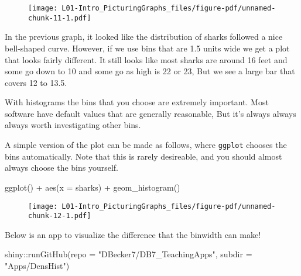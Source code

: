 \documentclass[
  letterpaper,
  DIV=11,
  numbers=noendperiod]{scrreprt}
\newenvironment{Shaded}{\begin{snugshade}}{\end{snugshade}}
\newcommand{\AttributeTok}[1]{\textcolor[rgb]{0.40,0.45,0.13}{#1}}
\newcommand{\FunctionTok}[1]{\textcolor[rgb]{0.28,0.35,0.67}{#1}}
\newcommand{\NormalTok}[1]{\textcolor[rgb]{0.00,0.23,0.31}{#1}}
\newcommand{\SpecialCharTok}[1]{\textcolor[rgb]{0.37,0.37,0.37}{#1}}
\newcommand{\StringTok}[1]{\textcolor[rgb]{0.13,0.47,0.30}{#1}}
\begin{document}
\begin{figure}[H]

{\centering \texttt{[image: L01-Intro\_PicturingGraphs\_files/figure-pdf/unnamed-chunk-11-1.pdf]}

}

\end{figure}

In the previous graph, it looked like the distribution of sharks
followed a nice bell-shaped curve. However, if we use bins that are 1.5
units wide we get a plot that looks fairly different. It still looks
like most sharks are around 16 feet and some go down to 10 and some go
as high is 22 or 23, But we see a large bar that covers 12 to 13.5.

With histograms the bins that you choose are extremely important. Most
software have default values that are generally reasonable, But it's
always always always worth investigating other bins.

A simple version of the plot can be made as follows, where
\texttt{ggplot} chooses the bins automatically. Note that this is rarely
desireable, and you should almost always choose the bins yourself.

\begin{Shaded}
\begin{Highlighting}[]
\FunctionTok{ggplot}\NormalTok{() }\SpecialCharTok{+} 
    \FunctionTok{aes}\NormalTok{(}\AttributeTok{x =}\NormalTok{ sharks) }\SpecialCharTok{+}
    \FunctionTok{geom\_histogram}\NormalTok{()}
\end{Highlighting}
\end{Shaded}

\begin{figure}[H]

{\centering \texttt{[image: L01-Intro\_PicturingGraphs\_files/figure-pdf/unnamed-chunk-12-1.pdf]}

}

\end{figure}

Below is an app to visualize the difference that the binwidth can make!

\begin{Shaded}
\begin{Highlighting}[]
\NormalTok{shiny}\SpecialCharTok{::}\FunctionTok{runGitHub}\NormalTok{(}\AttributeTok{repo =} \StringTok{"DBecker7/DB7\_TeachingApps"}\NormalTok{, }
    \AttributeTok{subdir =} \StringTok{"Apps/DensHist"}\NormalTok{)}
\end{Highlighting}
\end{Shaded}
\end{document}
